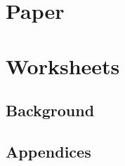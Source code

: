 \fancyhf{}
\fancyfoot[C]{\thepage} %
\fancyhead[RE,LO]{}																												%
\fancyhead[RE,LO]{\color{aaublue}\small\nouppercase\leftmark} %
\pagestyle{fancy}



\part{Paper}


\part{Worksheets}
\chapter{Background}




	
\printbibliography\clearpage



\cleardoublepage
\begin{appendices}
\chapter{Appendices}

\end{appendices}



